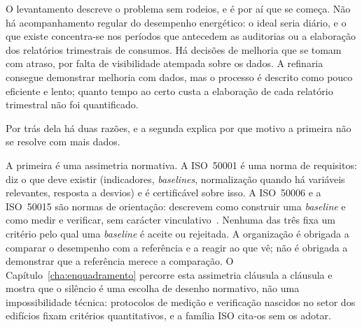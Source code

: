 O levantamento descreve o problema sem rodeios, e é por aí que se
começa. Não há acompanhamento regular do desempenho energético: o ideal
seria diário, e o que existe concentra-se nos períodos que antecedem as
auditorias ou a elaboração dos relatórios trimestrais de consumos. Há decisões de melhoria que se tomam com atraso, por falta de
visibilidade atempada sobre os dados. A refinaria consegue demonstrar
melhoria com dados, mas o processo é descrito como pouco eficiente e
lento; quanto tempo ao certo custa a elaboração de cada relatório trimestral não foi
quantificado. 

Por trás dela há duas razões, e a segunda explica por que motivo a
primeira não se resolve com mais dados.

A primeira é uma assimetria normativa. A ISO~50001 é uma norma de
requisitos: diz o que deve existir (indicadores, \emph{baselines},
normalização quando há variáveis relevantes, resposta a desvios) e é
certificável sobre isso. A ISO~50006 e a ISO~50015 são normas de
orientação: descrevem como construir uma \emph{baseline} e como medir e
verificar, sem carácter vinculativo~\cite{ISO50006_2014,ISO50015_2014}.
Nenhuma das três fixa um critério pelo qual uma \emph{baseline} é aceite
ou rejeitada. A organização é obrigada a comparar o desempenho com a
referência e a reagir ao que vê; não é obrigada a demonstrar que a
referência merece a comparação. O Capítulo~\ref{cha:enquadramento}
percorre esta assimetria cláusula a cláusula e mostra que o silêncio é
uma escolha de desenho normativo, não uma impossibilidade técnica:
protocolos de medição e verificação nascidos no setor dos edifícios
fixam critérios quantitativos, e a família ISO cita-os sem os adotar.


